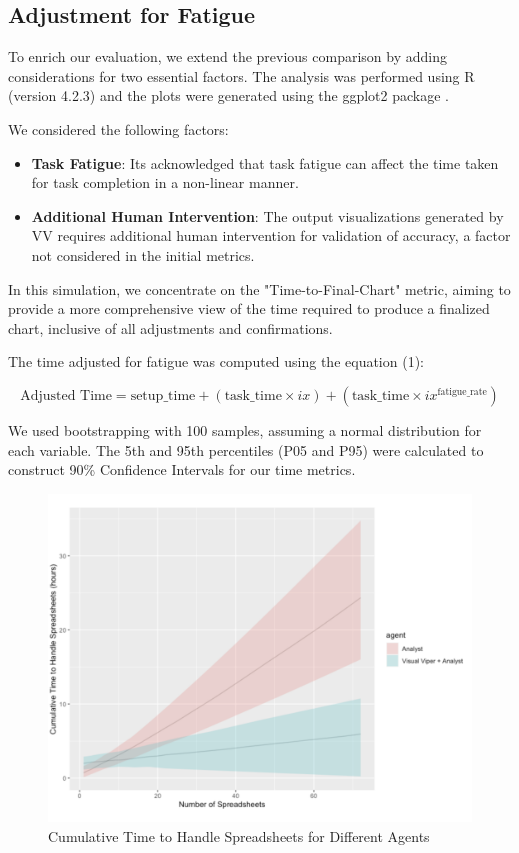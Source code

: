 \subsection{Adjustment for Fatigue}\label{adjustment-for-fatigue}

To enrich our evaluation, we extend the previous comparison by adding
considerations for two essential factors. The analysis was performed
using R (version 4.2.3)
\cite{41} and the plots were
generated using the ggplot2 package
\cite{13}.

We considered the following factors:

\begin{itemize}
\item
  \textbf{Task Fatigue}: It\textquotesingle s acknowledged that task
  fatigue can affect the time taken for task completion in a non-linear
  manner.
\item
  \textbf{Additional Human Intervention}: The output visualizations
  generated by VV requires additional human intervention for validation
  of accuracy, a factor not considered in the initial metrics.
\end{itemize}

In this simulation, we concentrate on the "Time-to-Final-Chart" metric,
aiming to provide a more comprehensive view of the time required to
produce a finalized chart, inclusive of all adjustments and
confirmations.

The time adjusted for fatigue was computed using the equation (1):

\begin{equation}
  \text{Adjusted Time} = \text{setup\_time} + (\text{task\_time} \times ix) + (\text{task\_time} \times ix^{\text{fatigue\_rate}})
\end{equation}

We used bootstrapping with 100 samples, assuming a normal distribution
for each variable. The 5th and 95th percentiles (P05 and P95) were
calculated to construct 90\% Confidence Intervals for our time metrics.

\begin{figure}[!ht]
  \centering
  \includegraphics[width=\textwidth]{media/fig19.png}
  \caption{Cumulative Time to Handle Spreadsheets for Different Agents}
  \label{fig:time_sim}
\end{figure}

